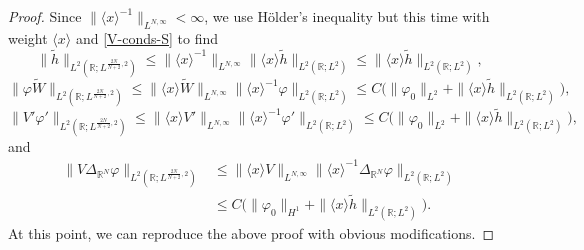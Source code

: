 \documentclass[10pt,leqno]{amsart}
\numberwithin{equation}{section}
\newcommand{\field}[1]{\mathbb{#1}}
\newcommand{\R}{\field{R}}          		%
\begin{document}
\begin{proof}
Since $\|\langle x\rangle ^{-1}\|_{L^{N,\infty}}<\infty$, we use H\" older's inequality but this time with weight $\langle x\rangle$ and \eqref{V-conds-S} to find
$$ \| \tilde{h} \|_{L^2 (\R ; L^{\frac{2N}{N+2} ,2})} \leq \|\langle x\rangle ^{-1}\|_{L^{N,\infty}} \|\langle x\rangle  \tilde{h}\|_{L^2 (\R ; L^2)}\leq  \|\langle x\rangle  \tilde{h}\|_{L^2 (\R ; L^2)},$$
$$ \| \varphi\tilde{W} \|_{L^2 (\R ; L^{\frac{2N}{N+2} ,2})} \leq \|\langle x\rangle \tilde{W}\|_{L^{N,\infty}} \|\langle x\rangle ^{-1} \varphi\|_{L^2 (\R ; L^2)}\leq C \big(\|\varphi_0\|_{L^2} + \|\langle x\rangle  \tilde{h}\|_{L^2 (\R ; L^2)}\big), $$
$$ \| V' \varphi ' \|_{L^2 (\R ; L^{\frac{2N}{N+2} ,2})} \leq \|\langle x\rangle V' \|_{L^{N,\infty}} \|\langle x\rangle ^{-1} \varphi ' \|_{L^2 (\R ; L^2)}\leq C \big(\|\varphi_0\|_{L^2} + \|\langle x\rangle  \tilde{h}\|_{L^2 (\R ; L^2)}\big) ,$$
and
\begin{align*}
\| V\Delta_{\R^N} \varphi \|_{L^2 (\R ; L^{\frac{2N}{N+2} ,2})} &\leq \|\langle x\rangle V \|_{L^{N,\infty}} \|\langle x\rangle ^{-1} \Delta_{\R^N} \varphi \|_{L^2 (\R ; L^2)} \\
&\leq C  \big(\|\varphi_0\|_{H^1} + \|\langle x\rangle  \tilde{h}\|_{L^2 (\R ; L^2)}\big) .
\end{align*} 
At this point, we can reproduce the above proof with obvious modifications.
\end{proof}
\end{document}
